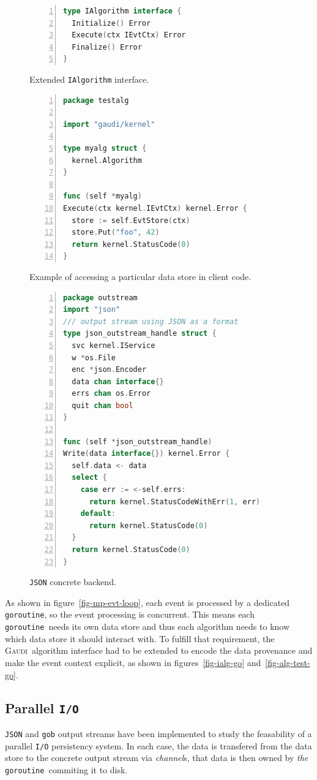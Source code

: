 \documentclass[a4paper]{jpconf}
\newcommand{\gaudi}{\textsc{Gaudi}}
\newcommand{\goroutine}{\texttt{goroutine}}
\begin{document}
\begin{figure}[h]
\begin{center}
\begin{minipage}{15pc}
\begin{lstlisting}[language=Go,
    basicstyle=\tiny,
    frame=trbl,
    numbers=left,
    showstringspaces=false,
    stringstyle=\ttfamily]
type IAlgorithm interface {
  Initialize() Error
  Execute(ctx IEvtCtx) Error
  Finalize() Error
}
\end{lstlisting}
    \caption{\label{fig-ialg-go}Extended \texttt{IAlgorithm} interface.}
\begin{lstlisting}[language=Go,
    basicstyle=\tiny,
    frame=trbl,
    numbers=left,
    showstringspaces=false,
    stringstyle=\ttfamily]
package testalg

import "gaudi/kernel"

type myalg struct {
  kernel.Algorithm
}

func (self *myalg)
Execute(ctx kernel.IEvtCtx) kernel.Error {
  store := self.EvtStore(ctx)
  store.Put("foo", 42)
  return kernel.StatusCode(0)
}
\end{lstlisting}
    \caption{\label{fig-alg-test-go}Example of accessing a particular
      data store in client code.}
\begin{lstlisting}[language=Go,
    basicstyle=\tiny,
    frame=trbl,
    numbers=left,
    showstringspaces=false,
    stringstyle=\ttfamily]
package outstream
import "json"
/// output stream using JSON as a format
type json_outstream_handle struct {
  svc kernel.IService
  w *os.File
  enc *json.Encoder
  data chan interface{}
  errs chan os.Error
  quit chan bool
}

func (self *json_outstream_handle) 
Write(data interface{}) kernel.Error {
  self.data <- data
  select {
    case err := <-self.errs:
      return kernel.StatusCodeWithErr(1, err)
    default:
      return kernel.StatusCode(0)
  }
  return kernel.StatusCode(0)
}
\end{lstlisting}
    \caption{\label{fig-json-out-go}\texttt{JSON} concrete backend.}
  \end{minipage} 

\end{center}
\end{figure}

As shown in figure~\ref{fig-mp-evt-loop}, each event is processed by a
dedicated \goroutine, so the event processing is concurrent.
This means each \goroutine\ needs its own data store and thus each
algorithm needs to know which data store it should interact with.
To fulfill that requirement, the \gaudi\ algorithm interface had to be
extended to encode the data provenance and make the event context
explicit, as shown in figures~\ref{fig-ialg-go} and~\ref{fig-alg-test-go}.

\subsection{Parallel \texttt{I/O}}
\texttt{JSON} and \texttt{gob} output streams have been implemented to
study the feasability of a parallel \texttt{I/O} persistency system.
In each case, the data is transfered from the data store to the
concrete output stream via \emph{channel}s, that data is then owned by
\emph{the} \goroutine\ commiting it to disk.
\end{document}
